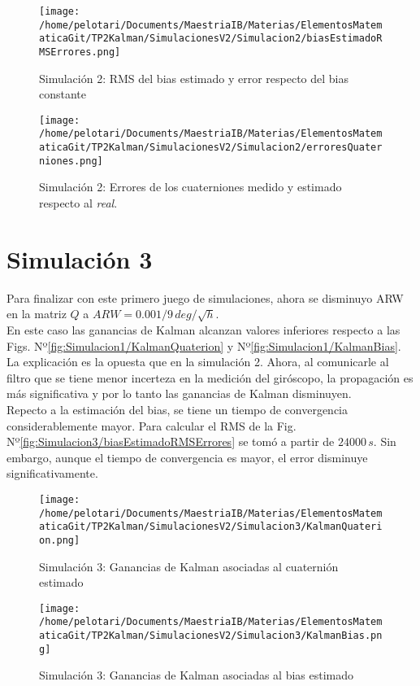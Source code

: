 \documentclass[a4paper,11pt,twoside]{IT-CNEA}
\begin{document}
\begin{figure}[h!]
\centering
\texttt{[image: /home/pelotari/Documents/MaestriaIB/Materias/ElementosMatematicaGit/TP2Kalman/SimulacionesV2/Simulacion2/biasEstimadoRMSErrores.png]}
\caption{Simulación 2:  RMS del bias estimado y error respecto del bias constante}
\label{fig:Simulacion2/biasEstimadoRMSErrores}
\end{figure}
\begin{figure}[h!]
\centering
\texttt{[image: /home/pelotari/Documents/MaestriaIB/Materias/ElementosMatematicaGit/TP2Kalman/SimulacionesV2/Simulacion2/erroresQuaterniones.png]}
\caption{Simulación 2:  Errores de los cuaterniones medido y estimado respecto al \textit{real}.}
\label{fig:Simulacion2/erroresQuaterniones}
\end{figure}
\section{Simulación 3}
Para finalizar con este primero juego de simulaciones, ahora se disminuyo ARW en la matriz $Q$ a $ARW=0.001/9\,deg/\sqrt{h}$.
\\ En este caso las ganancias de Kalman alcanzan valores inferiores respecto a las Figs. Nº\ref{fig:Simulacion1/KalmanQuaterion} y Nº\ref{fig:Simulacion1/KalmanBias}. La explicación es la opuesta que en la simulación 2. Ahora, al comunicarle al filtro que se tiene menor incerteza en la medición del giróscopo, la propagación es más significativa y por lo tanto las ganancias de Kalman disminuyen. 
\\ Repecto a la estimación del bias, se tiene un tiempo de convergencia considerablemente mayor. Para calcular el RMS de la Fig. Nº\ref{fig:Simulacion3/biasEstimadoRMSErrores} se tomó a partir de $24000\,s$. Sin embargo, aunque el tiempo de convergencia es mayor, el error disminuye significativamente. 
\begin{figure}[h!]
\centering
\texttt{[image: /home/pelotari/Documents/MaestriaIB/Materias/ElementosMatematicaGit/TP2Kalman/SimulacionesV2/Simulacion3/KalmanQuaterion.png]}
\caption{Simulación 3:  Ganancias de Kalman asociadas al cuaternión estimado}
\label{fig:Simulacion3/KalmanQuaterion}
\end{figure}
\begin{figure}[h!]
\centering
\texttt{[image: /home/pelotari/Documents/MaestriaIB/Materias/ElementosMatematicaGit/TP2Kalman/SimulacionesV2/Simulacion3/KalmanBias.png]}
\caption{Simulación 3:  Ganancias de Kalman asociadas al bias estimado}
\label{fig:Simulacion3/KalmanBias}
\end{figure}
\end{document}
